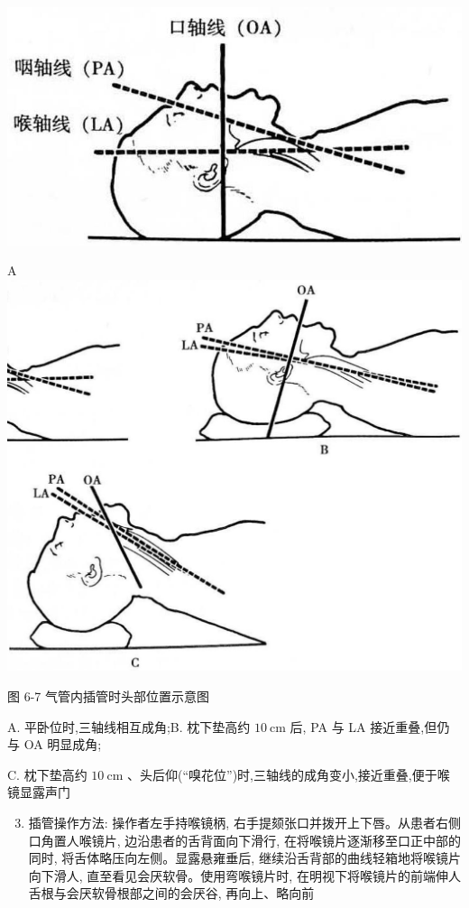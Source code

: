 \documentclass[10pt]{article}
\begin{document}
\begin{center}
\includegraphics[max width=\textwidth]{2024_07_09_002a177993bd97d1d6d7g-089}
\end{center}

A\\
\includegraphics[max width=\textwidth, center]{2024_07_09_002a177993bd97d1d6d7g-089(1)}

图 6-7 气管内插管时头部位置示意图

A. 平卧位时,三轴线相互成角;B. 枕下垫高约 $10 \mathrm{~cm}$ 后, PA 与 LA 接近重叠,但仍与 OA 明显成角;

C. 枕下垫高约 $10 \mathrm{~cm}$ 、头后仰(“嗅花位”)时,三轴线的成角变小,接近重叠,便于喉镜显露声门

\begin{enumerate}
  \setcounter{enumi}{2}
  \item 插管操作方法: 操作者左手持喉镜柄, 右手提颏张口并拨开上下唇。从患者右侧口角置人喉镜片, 边沿患者的舌背面向下滑行, 在将喉镜片逐渐移至口正中部的同时, 将舌体略压向左侧。显露悬雍垂后, 继续沿舌背部的曲线轻箱地将喉镜片向下滑人, 直至看见会厌软骨。使用弯喉镜片时, 在明视下将喉镜片的前端伸人舌根与会厌软骨根部之间的会厌谷, 再向上、略向前
\end{enumerate}
\end{document}
